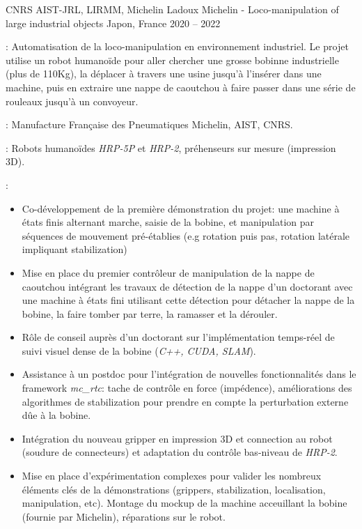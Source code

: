 \begin{cventries}
  \cventry
    {CNRS AIST-JRL, LIRMM, Michelin Ladoux} %
    {Michelin - Loco-manipulation of large industrial objects} %
    {Japon, France} %
    {2020 -- 2022} %
    {
      \begin{cvitems} 
        \item {} : Automatisation de la loco-manipulation en environnement industriel. Le projet utilise un robot humanoïde pour aller chercher une grosse bobinne industrielle (plus de 110Kg), la déplacer à travers une usine jusqu'à l'insérer dans une machine, puis en extraire une nappe de caoutchou à faire passer dans une série de rouleaux jusqu'à un convoyeur.
        \item {} : Manufacture Française des Pneumatiques Michelin, AIST, CNRS.
        \item {} : Robots humanoïdes \emph{HRP-5P} et \emph{HRP-2}, préhenseurs sur mesure (impression 3D).
        \item {} :
          \begin{itemize}
            \item Co-développement de la première démonstration du projet: une machine à états finis alternant marche, saisie de la bobine, et manipulation par séquences de mouvement pré-établies (e.g rotation puis pas, rotation latérale impliquant stabilization)
            \item Mise en place du premier contrôleur de manipulation de la nappe de caoutchou intégrant les travaux de détection de la nappe d'un doctorant avec une machine à états fini utilisant cette détection pour détacher la nappe de la bobine, la faire tomber par terre, la ramasser et la dérouler.
            \item Rôle de conseil auprès d'un doctorant sur l'implémentation temps-réel de suivi visuel dense de la bobine (\emph{C++, CUDA, SLAM}).
            \item Assistance à un postdoc pour l'intégration de nouvelles fonctionnalités dans le framework \emph{mc\_rtc}: tache de contrôle en force (impédence), améliorations des algorithmes de stabilization pour prendre en compte la perturbation externe dûe à la bobine.
            \item Intégration du nouveau gripper en impression 3D et connection au robot (soudure de connecteurs) et adaptation du contrôle bas-niveau de \emph{HRP-2}.
            \item Mise en place d'expérimentation complexes pour valider les nombreux éléments clés de la démonstrations (grippers, stabilization, localisation, manipulation, etc). Montage du mockup de la machine acceuillant la bobine (fournie par Michelin), réparations sur le robot.

\end{itemize}
\end{cvitems}}
\end{cventries}
